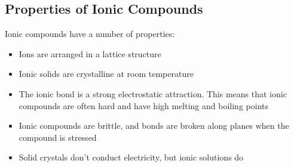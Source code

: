             \subsection*{Properties of Ionic Compounds}
            \nopagebreak \noindent
        \label{m38684*id142811}Ionic compounds have a number of properties:\par 
        \label{m38684*id142815}\begin{itemize}[noitemsep]
            \label{m38684*uid72}\item Ions are arranged in a lattice structure
\label{m38684*uid73}\item Ionic solids are crystalline at room temperature
\label{m38684*uid74}\item The ionic bond is a strong electrostatic attraction. This means that ionic compounds are often hard and have high melting and boiling points
\label{m38684*uid75}\item Ionic compounds are brittle, and bonds are broken along planes when the compound is stressed
\label{m38684*uid76}\item Solid crystals don't conduct electricity, but ionic solutions do
\end{itemize}
\label{m38684*secfhsst!!!underscore!!!id522}
